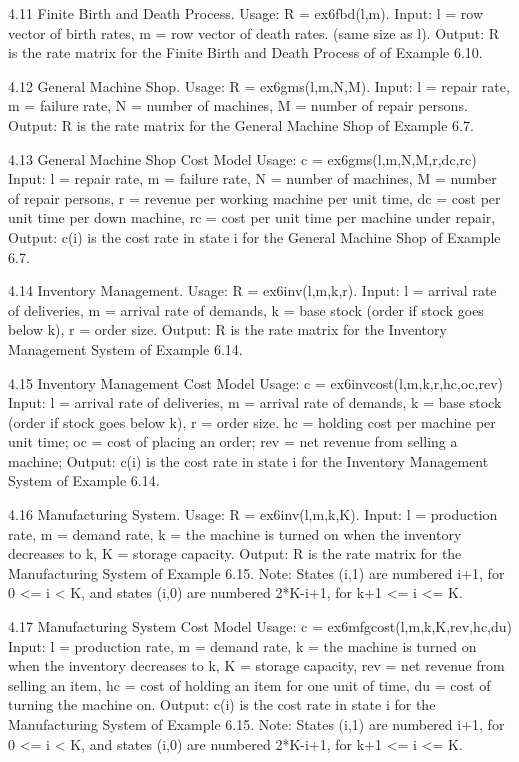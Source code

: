 4.11 Finite Birth and Death Process.
Usage:  R = ex6fbd(l,m).
Input: l =  row vector of birth rates,
m =  row vector of death rates. (same size as l).
Output: R is the rate matrix for the Finite Birth and Death Process of  of Example  6.10.

4.12 General Machine Shop.
Usage:  R = ex6gms(l,m,N,M).
Input: l =  repair rate,
m =  failure rate,
N = number of machines,
M = number of repair persons.
Output: R is the rate matrix for the General Machine Shop of Example  6.7.

4.13 General Machine Shop Cost Model
Usage:  c = ex6gms(l,m,N,M,r,dc,rc)
Input: l =  repair rate,
m =  failure rate,
N = number of machines,
M = number of repair persons,
r = revenue per working machine per unit time,
dc = cost per unit time per down machine,
rc = cost per unit time per machine under repair,
Output: c(i) is the cost rate in state i for the General Machine Shop of Example  6.7.
 
4.14 Inventory Management.
Usage:  R = ex6inv(l,m,k,r).
Input: l =  arrival rate of deliveries,
m =  arrival rate of demands,
k = base stock (order if stock goes below k),
r = order size.
Output: R is the rate matrix for the Inventory Management System of Example  6.14.

4.15 Inventory Management Cost Model
Usage:  c = ex6invcost(l,m,k,r,hc,oc,rev)
Input: l =  arrival rate of deliveries,
m =  arrival rate of demands,
k = base stock (order if stock goes below k),
r = order size.
hc = holding cost per machine per unit time;
oc = cost of placing an order;
rev = net revenue from selling a machine;
Output: c(i) is the cost rate in state i  for the Inventory Management System of Example  
6.14.

4.16 Manufacturing System.
Usage:  R = ex6inv(l,m,k,K).
Input: l =  production rate,
m =  demand rate,
k = the machine is turned on when the inventory decreases to k,
K = storage capacity.
Output: R is the rate matrix for the Manufacturing System of Example  6.15.
Note: States (i,1) are numbered i+1, for 0 <= i < K, and states (i,0) are numbered 2*K-i+1, for k+1 <= i <= K.

4.17 Manufacturing System Cost Model
Usage:  c = ex6mfgcost(l,m,k,K,rev,hc,du)
Input: l =  production rate,
m =  demand rate,
k = the machine is turned on when the inventory decreases to k,
K = storage capacity,
rev =  net revenue from selling an item,
hc = cost of holding an item for one unit of time,
du = cost of turning the machine on.
Output: c(i) is the cost rate in state i for the Manufacturing System of Example  6.15.
Note: States (i,1) are numbered i+1, for 0 <= i < K, and states (i,0) are numbered 2*K-i+1, for k+1 <= i <= K.  
 
